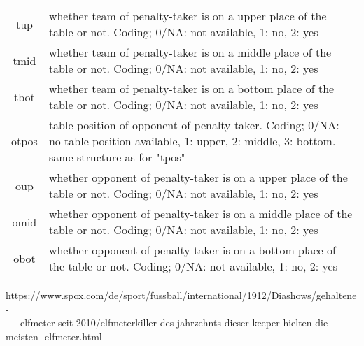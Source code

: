 \documentclass[12pt,dvipsnames]{article}%
\begin{document}
\begin{table}[h]
\begin{tabular}{ c | p{13cm}  }
tup & whether team of penalty-taker is on a upper place of the table or not. Coding; 0/NA: not available, 1: no, 2: yes \\

tmid & whether team of penalty-taker is on a middle place of the table or not. Coding; 0/NA: not available, 1: no, 2: yes \\

tbot & whether team of penalty-taker is on a bottom place of the table or not. Coding; 0/NA: not available, 1: no, 2: yes \\
 
otpos & table position of opponent of penalty-taker. Coding; 0/NA: no table position available, 1: upper, 2: middle, 3: bottom. same structure as for "tpos"  \\

oup & whether opponent of penalty-taker is on a upper place of the table or not. Coding; 0/NA: not available, 1: no, 2: yes \\

omid & whether opponent of penalty-taker is on a middle place of the table or not. Coding; 0/NA: not available, 1: no, 2: yes \\

obot & whether opponent of penalty-taker is on a bottom place of the table or not. Coding; 0/NA: not available, 1: no, 2: yes \\
 
 \end{tabular}
  \vspace{+0.5cm}
  
 \small{\footnotemark[5] https://www.spox.com/de/sport/fussball/international/1912/Diashows/gehaltene-\\ \ \ \ elfmeter-seit-2010/elfmeterkiller-des-jahrzehnts-dieser-keeper-hielten-die-meisten
 \newline \hspace*{-112mm} -elfmeter.html }
 \end{table}

 \pagebreak
\end{document}

